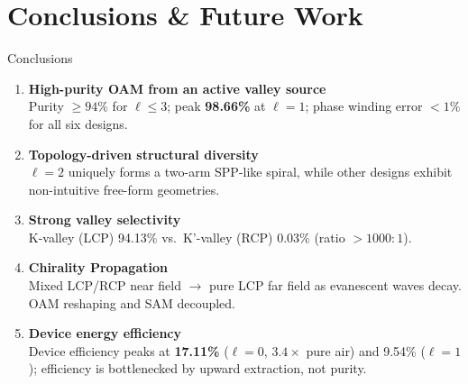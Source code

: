 \documentclass[aspectratio=169, 10pt]{beamer}
\newcommand{\highlight}[1]{\textcolor{NYCUgold}{\textbf{#1}}}
\begin{document}
\section{Conclusions \& Future Work}



\begin{frame}[plain]

\end{frame}




\begin{frame}{Conclusions}
  \begin{enumerate}
    \setlength\itemsep{7pt}
    \item \textbf{High-purity OAM from an active valley source}\\
      Purity $\ge94\%$ for $\ell\le3$; peak \highlight{98.66\%} at $\ell=1$; phase winding error $<1\%$ for all six designs.
    \item \textbf{Topology-driven structural diversity} \\ 
    $\ell=2$ uniquely forms a two-arm SPP-like spiral, while other designs exhibit non-intuitive free-form geometries.\\
    \item \textbf{Strong valley selectivity}\\
      K-valley (LCP) 94.13\% vs.\ K'-valley (RCP) 0.03\% (ratio $>1000:1$).
    \item \textbf{Chirality Propagation}\\
      Mixed LCP/RCP near field $\to$ pure LCP far field as evanescent waves decay. OAM reshaping and SAM decoupled.
      \item \textbf{Device energy efficiency}\\
	  Device efficiency peaks at \highlight{17.11\%} ($\ell=0$, $3.4\times$ pure air) and 9.54\% ($\ell=1$); efficiency is bottlenecked by upward extraction, not purity.
  \end{enumerate}
\end{frame}
\end{document}
